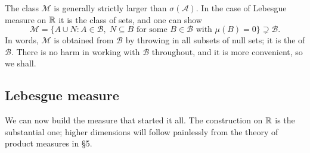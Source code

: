 \documentclass[a4paper]{scrartcl}
\newcommand{\cA}{\mathcal{A}}
\newcommand{\cB}{\mathcal{B}}
\newcommand{\cM}{\mathcal{M}}
\begin{document}
\begin{remark}
	The class $\cM$ is generally strictly larger than $\sigma(\cA)$. In the case of Lebesgue measure on $\mathbb{R}$ it is the class of  sets, and one can show
	$$
	\cM = \{ A \cup N : A \in \cB, \; N \subseteq B \text{ for some } B \in \cB \text{ with } \mu(B) = 0 \} \supsetneq \cB.
	$$
	In words, $\cM$ is obtained from $\cB$ by throwing in all subsets of null sets; it is the  of $\cB$. There is no harm in working with $\cB$ throughout, and it is more convenient, so we shall.
\end{remark}
\subsection{Lebesgue measure}

We can now build the measure that started it all. The construction on $\mathbb{R}$ is the substantial one; higher dimensions will follow painlessly from the theory of product measures in \S5.
\end{document}
